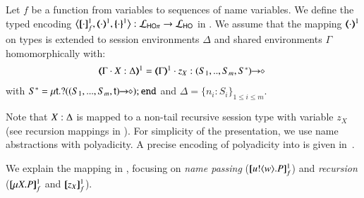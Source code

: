 \begin{definition}
\label{d:enc:hopitoho}
Let $f$ be a function from variables to sequences of name variables.
%
We define the typed encoding 
$\enco{\map{\cdot}^{1}_f, \mapt{\cdot}^{1}, \mapa{\cdot}^{1}}: \tyl{L}_{\HOp} \to \tyl{L}_{\HO}$ in 
. 
We assume that the mapping $(\!\!\langle\cdot\rangle\!\!)^{1}$ on types is extended to 
session environments $\Delta$
and
shared environments $\Gamma$ homomorphically with: 
\[
	\begin{array}{l}
		\tmap{\Gamma \cat \varp{X}:\Delta}{1}  =  \tmap{\Gamma}{1} \cat z_X:\shot{(S_1,..,S_m,S^*)} \ 
	\end{array}
\]
with
$S^* = \mu\mathsf{t}.? ((S_1,...,S_m,\mathsf{t})\!\! \rightarrow\!\! \diamond) ; \mathtt{end}$
and $\Delta = \{n_i:S_i\}_{1\leq i\leq m}$. 
\end{definition}

\smallskip 
\noi Note that $X:\Delta$ is mapped to a non-tail
recursive session type with variable $z_X$ (see recursion mappings in ).
For simplicity of the presentation, %
we use name abstractions with polyadicity.
A precise encoding of polyadicity into \HO is given in~.

We explain the mapping in , focusing 
on {\em name passing} ($[\!\![u ! \langle w \rangle . P]\!\!]^1_f$) and  
{\em recursion} ($[\!\![\mu X. P]\!\!]^1_f$ and $[\!\![z_X]\!\!]^1_f$). 

